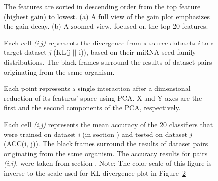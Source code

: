 \documentclass{bmcart}
\def\texttt{[image: ]}
\begin{document}
\begin{backmatter}
\begin{figure}[h!]
    \centering
     \caption{}
      \caption*{The features are sorted in descending order from the top feature (highest gain) to lowest. (a) A full view of the gain plot emphasizes the gain decay.  (b) A zoomed view, focused on the top 20 features.}%
    \label{fig:feature_importance}%
\end{figure}

\begin{figure}[h!]
  \caption{}
      \label{fig:divergence}
      \caption*{Each cell \textit{(i,j)} represents the divergence from  a source datasets \textit{i} to a target dataset \textit{j} (KL(j $||$ i)), based on their miRNA seed family distributions. The black frames surround the results of dataset pairs originating from the same organism.}
      \end{figure}

\begin{figure}[h!]
  \caption{} 
      \label{fig:feature_pca}
      \caption*{Each point represents a single interaction after a dimensional reduction of its features' space using PCA. X and Y axes are the first and the second components of the PCA, respectively.}
      \end{figure}

\begin{figure}[h!]
  \caption{}
    \label{fig:crossdataset}
    \caption*{Each cell \textit{(i,j)} represents the mean accuracy of the 20 classifiers that were trained on dataset \textit{i} (in section ) and tested on dataset \textit{j} (ACC(i, j)). The black frames surround the results of dataset pairs originating from the same organism. The accuracy results for pairs \textit{(i,i)}, were taken from section . Note: The color scale of this figure is inverse to the scale used for KL-divergence plot in Figure~\ref{fig:divergence}}
      \end{figure}




\end{backmatter}
\end{document}
